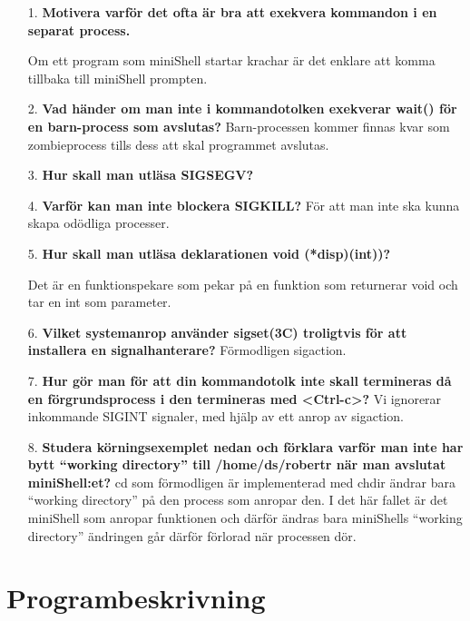\documentclass[a4paper,10pt,titlepage]{article}
\begin{document}
\begin{enumerate}
	\item[1.] \textbf{\footnotesize Motivera varför det ofta är bra att exekvera kommandon i en separat process.}

    Om ett program som miniShell startar krachar är det enklare att komma
    tillbaka till miniShell prompten.

	\item[2.] \textbf{\footnotesize Vad händer om man inte i kommandotolken exekverar wait() för en barn-process som avslutas?}
	Barn-processen kommer finnas kvar som zombieprocess tills dess att skal
    programmet avslutas.

	\item[3.] \textbf{\footnotesize Hur skall man utläsa SIGSEGV?}

	\item[4.] \textbf{\footnotesize Varför kan man inte blockera SIGKILL?}
    För att man inte ska kunna skapa odödliga processer.

	\item[5.] \textbf{\footnotesize Hur skall man utläsa deklarationen void (*disp)(int))?}
	
    Det är en funktionspekare som pekar på en funktion som returnerar void och
    tar en int som parameter.

	\item[6.] \textbf{\footnotesize Vilket systemanrop använder sigset(3C) troligtvis för att installera en signalhanterare?}
	Förmodligen sigaction.

	\item[7.] \textbf{\footnotesize Hur gör man för att din kommandotolk inte skall termineras då en förgrundsprocess i den termineras med <Ctrl-c>?}
	Vi ignorerar inkommande SIGINT signaler, med hjälp av ett anrop av sigaction.

	\item[8.] \textbf{\footnotesize Studera körningsexemplet nedan och förklara varför man inte har bytt “working directory” till /home/ds/robertr när man avslutat miniShell:et?}
    cd som förmodligen är implementerad med chdir ändrar bara “working
    directory” på den process som anropar den. I det här fallet är det miniShell
    som anropar funktionen och därför ändras bara miniShells “working directory”
    ändringen går därför förlorad när processen dör.

\end{enumerate}

\newpage
\section{Programbeskrivning}
\end{document}
